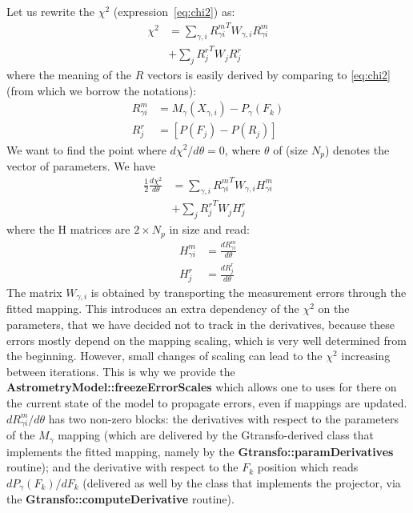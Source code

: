 \documentclass[a4paper,12pt]{scrartcl}
\newcommand{\ClName}[1]{{\bf #1}}
\def\bf{\normalfont\bfseries}
\begin{document}
Let us rewrite the $\chi^2$ (expression~\ref{eq:chi2}) as:
\begin{align}
\chi^2 & =  \sum_{\gamma,i}  {R^m_{\gamma i}}^T W_{\gamma,i}  R^m_{\gamma i} \nonumber \\
         & +\sum_j {R^r_{j}}^T W_{j}  R^r_{j} \label{eq:grad_chi2}
\end{align}
where the meaning of the $R$ vectors is easily derived by comparing to
\ref{eq:chi2} (from which we borrow the notations):
\begin{align}
R^m_{\gamma i}  &= M_\gamma(X_{\gamma,i})-P_{\gamma}(F_k) \\
R^r_{j} &= [P(F_j)-P(R_j)]  \label{eq:ref_res}
\end{align}
We want to find the point where $d \chi^2/d \theta = 0$,
where $\theta$ of (size $N_p$) denotes the vector of parameters. We have
\begin{align}
\frac{1}{2} \frac{d \chi^2}{d \theta} & =  \sum_{\gamma,i}  {R^m_{\gamma i}}^T W_{\gamma,i}  H^m_{\gamma i} \nonumber \\
         & +\sum_j {R^r_{j}}^T W_{j}  H^r_{j} \label{eq:gradient}
\end{align}
where the H matrices are $2 \times N_p$ in size and read:
\begin{align}
 H^m_{\gamma i} & = \frac{d {R^m_{\gamma i}}}{ d \theta} \\
  H^r_{j}     & = \frac{d {R^r_{j}}}{ d \theta}
\end{align}
The matrix $W_{\gamma,i}$ is obtained by transporting the measurement
errors through the fitted mapping. This introduces an extra dependency of the
$\chi^2$ on the parameters, that we have decided not to track in the derivatives, because
these errors mostly depend on the mapping scaling, which is very well
determined from the beginning. However, small changes of scaling can
lead to the $\chi^2$ increasing between iterations. This is why we
provide the \ClName{AstrometryModel::freezeErrorScales} which allows
one to uses for there on the {\textit current} state of the model to 
propagate errors, even if mappings are updated. $d R^m_{\gamma i}/d \theta$
has two non-zero blocks: the derivatives with respect to the parameters of the $M_\gamma$
mapping
(which are delivered by the Gtransfo-derived class that implements the
fitted mapping, namely by the \ClName{Gtransfo::paramDerivatives} routine); and the derivative with respect to the $F_k$ position which reads $d P_\gamma(F_k)/d F_k$ (delivered as well by the class that implements the projector, via the \ClName{Gtransfo::computeDerivative} routine).
\end{document}
